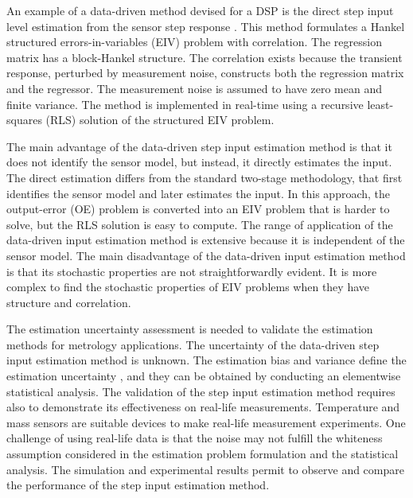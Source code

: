 An example of a data-driven method devised for a DSP is the direct step input level estimation from the sensor step response \citep{Markovsky15cep}.
This method formulates a Hankel structured errors-in-variables (EIV) problem with correlation.
The regression matrix has a block-Hankel structure.
The correlation exists because the transient response, perturbed by measurement noise, constructs both the regression matrix and the regressor.
The measurement noise is assumed to have zero mean and finite variance.
The method is implemented in real-time using a recursive least-squares (RLS) solution of the structured EIV problem.

The main advantage of the data-driven step input estimation method is that it does not identify the sensor model, but instead, it directly estimates the input. 
The direct estimation differs from the standard two-stage methodology, that first identifies the sensor model and later estimates the input.
In this approach, the output-error (OE) problem is converted into an EIV problem that is harder to solve, but the RLS solution is easy to compute.
The range of application of the data-driven input estimation method is extensive because it is independent of the sensor model.
The main disadvantage of the data-driven input estimation method is that its stochastic properties are not straightforwardly evident. 
It is more complex to find the stochastic properties of EIV problems when they have structure and correlation.


The estimation uncertainty assessment is needed to validate the estimation methods for metrology applications.
The uncertainty of the data-driven step input estimation method \citep{Markovsky15ieee} is unknown.
The estimation bias and variance define the estimation uncertainty \citep{Pintelon12Book}, and they can be obtained by conducting an elementwise statistical analysis. 
The validation of the step input estimation method requires also to demonstrate its effectiveness on real-life measurements.
Temperature and mass sensors are suitable devices to make real-life measurement experiments.
One challenge of using real-life data is that the noise may not fulfill the whiteness assumption considered in the estimation problem formulation and the statistical analysis.
The simulation and experimental results permit to observe and compare the performance of the step input estimation method.

